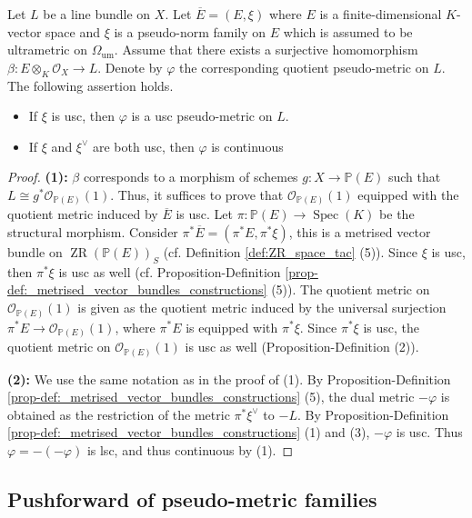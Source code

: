 \documentclass [11pt,reqno]{amsart}
\newcommand{\1}{\mathmybb{1}}
\def\cO{{\mathcal{O}}}
\def\Spec{\operatorname{Spec}}
\def\um{\operatorname{um}}
\def\ZR{\operatorname{ZR}}
\begin{document}
\begin{proposition}
\label{prop:regularity_quotient_pseudo-metric_families}
Let $L$ be a line bundle on $X$. Let $\overline{E}=(E,\xi)$ where $E$ is a finite-dimensional $K$-vector space and $\xi$ is a pseudo-norm family on $E$ which is assumed to be ultrametric on $\Omega_{\um}$. Assume that there exists a surjective homomorphism $\beta : E \otimes_{K} \cO_{X} \to L$. Denote by $\varphi$ the corresponding quotient pseudo-metric on $L$. The following assertion holds.
\begin{itemize}
	\item[(1)] If $\xi$ is usc, then $\varphi$ is a usc pseudo-metric on $L$.
	\item[(2)] If $\xi$ and $\xi^{\vee}$ are both usc, then $\varphi$ is continuous
\end{itemize}
\end{proposition}

\begin{proof} 
\textbf{(1):} $\beta$ corresponds to a morphism of schemes $g:X\to \mathbb{P}(E)$ such that $L\cong g^{\ast}\cO_{\mathbb{P}(E)}(1)$. Thus, it suffices to prove that $\cO_{\mathbb{P}(E)}(1)$ equipped with the quotient metric induced by $\overline{E}$ is usc. Let $\pi:\mathbb{P}(E) \to \Spec(K)$ be the structural morphism. Consider $\pi^{\ast}\overline{E}=(\pi^{\ast}E,\pi^{\ast}\xi)$, this is a metrised vector bundle on $\ZR(\mathbb{P}(E))_{S}$ (cf. Definition \ref{def:ZR_space_tac} (5)). Since $\xi$ is usc, then $\pi^{\ast}\xi$ is usc as well (cf. Proposition-Definition \ref{prop-def:_metrised_vector_bundles_constructions} (5)). The quotient metric on $\cO_{\mathbb{P}(E)}(1)$ is given as the quotient metric induced by the universal surjection $\pi^{\ast}E \to \cO_{\mathbb{P}(E)}(1)$, where $\pi^{\ast}E$ is equipped with $\pi^{\ast}\xi$. Since $\pi^{\ast}\xi$ is usc, the quotient metric on $\cO_{\mathbb{P}(E)}(1)$ is usc as well (Proposition-Definition (2)). 

\textbf{(2):} We use the same notation as in the proof of (1). By Proposition-Definition \ref{prop-def:_metrised_vector_bundles_constructions} (5), the dual metric $-\varphi$ is obtained as the restriction of the metric $\pi^{\ast}\xi^{\vee}$ to $-L$. By Proposition-Definition \ref{prop-def:_metrised_vector_bundles_constructions} (1) and (3), $-\varphi$ is usc. Thus $\varphi=-(-\varphi)$ is lsc, and thus continuous by (1).
\end{proof}

\subsection{Pushforward of pseudo-metric families}
\label{sub:pushforward_pseudo-metric_families}
\end{document}
